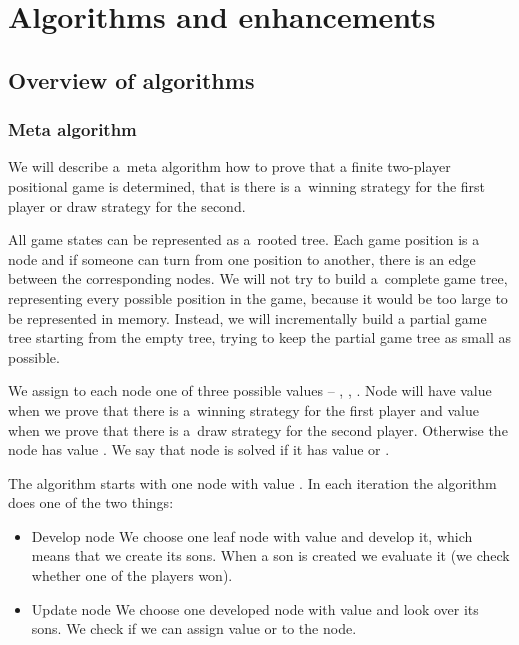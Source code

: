 \chapter{Algorithms and enhancements}

\section{Overview of algorithms}

\subsection{Meta algorithm}


We will describe a~meta algorithm how to prove that a finite two-player
positional game is determined, that is there is a~winning strategy for the first
player or draw strategy for the second.

All game states can be represented as a~rooted tree. Each game position is a
node and if someone can turn from one position to another, there is an edge
between the corresponding nodes. We will not try to build a~complete game tree,
representing every possible position in the game, because it would be too large
to be represented in memory. Instead, we will incrementally build a partial game 
tree starting from the empty tree, trying to keep the partial game tree as small as
possible.

We assign to each node one of three possible values -- \value{true},
\value{false}, \value{unknown}. Node will have value \value{true} when we prove
that there is a~winning strategy for the first player and value \value{false}
when we prove that there is a~draw strategy for the second player. Otherwise
the node has value \value{unknown}. We say that node is solved if it has value
\value{true} or \value{false}.

The algorithm starts with one node with value \value{unknown}. In each iteration the
algorithm does one of the two things:

\begin{itemize} 
	\item{Develop node} We choose one leaf node with value \value{unknown}
		and develop it, which means that we create its sons. When 
		a son is created we evaluate it (we check whether one of the players
		won).
	\item{Update node} We choose one developed node with value \value{unknown}
		and look over its sons. We check if we can assign value \value{true} 
		or \value{false} to the node.
\end{itemize}


